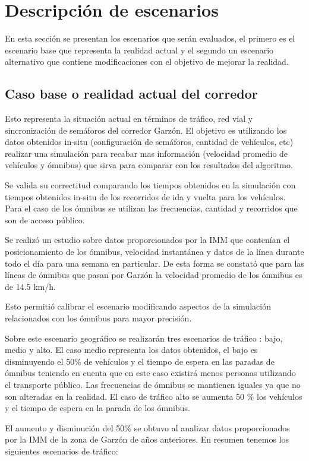 \section{Descripción de escenarios}
En esta sección se presentan los escenarios que serán evaluados, el primero es el escenario base que representa la realidad actual y el segundo un escenario alternativo que contiene modificaciones con el objetivo de mejorar la realidad.

\subsection{Caso base o realidad actual del corredor}
Esto representa la situación actual en términos de tráfico, red vial y sincronización de semáforos del corredor Garzón. El objetivo es utilizando los datos obtenidos in-situ (configuración de semáforos, cantidad de vehículos, etc) realizar una simulación para recabar mas información (velocidad promedio de vehículos y ómnibus) que sirva para comparar con los resultados del algoritmo. 

Se valida su correctitud comparando los tiempos obtenidos en la simulación con tiempos obtenidos in-situ de los recorridos de ida y vuelta para los vehículos. Para el caso de los ómnibus se utilizan las frecuencias, cantidad y recorridos que son de acceso público.

Se realizó un estudio sobre datos proporcionados por la IMM que contenían el posicionamiento de los ómnibus, velocidad instantánea y datos de la línea durante todo el día para una semana en particular. De esta forma se constató que para las líneas de ómnibus que pasan por Garzón la velocidad promedio de los ómnibus es de 14.5 km/h.

Esto permitió calibrar el escenario modificando aspectos de la simulación relacionados con los ómnibus para mayor precisión.

Sobre este escenario geográfico se realizarán tres escenarios de tráfico : bajo, medio y alto.
El caso medio representa los datos obtenidos, el bajo es disminuyendo el 50\% de vehículos y el tiempo de espera en las paradas de ómnibus teniendo en cuenta que en este caso existirá menos personas utilizando el transporte público. Las frecuencias de ómnibus se mantienen iguales ya que no son alteradas en la realidad.
El caso de tráfico alto se aumenta 50 \%  los vehículos y el tiempo de espera en la parada de los ómnibus.

El aumento y disminución del 50\% se obtuvo al analizar datos proporcionados por la IMM de la zona de Garzón de años anteriores. \newline
En resumen tenemos los siguientes escenarios de tráfico:

